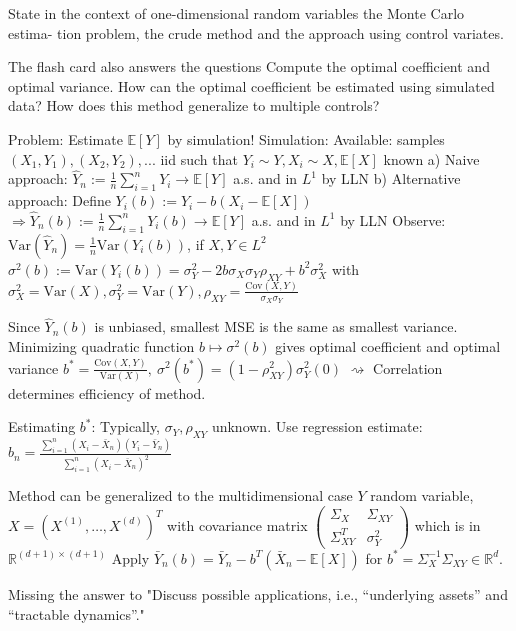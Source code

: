 State in the context of one-dimensional random variables the Monte Carlo estima-
tion problem, the crude method and the approach using control variates.

The flash card also answers the questions
Compute the optimal coefficient and optimal variance.
How can the optimal coefficient be estimated using simulated data?
How does this method generalize to multiple controls?


Problem: Estimate \(\mathbb{E}[Y]\) by simulation!
Simulation: Available: samples \((X_1, Y_1), (X_2, Y_2), ...\) iid such that \(Y_i \sim Y, X_i \sim X, \mathbb{E}[X]\) known
a) Naive approach:
\(\hat{Y}_n := \frac{1}{n} \sum_{i=1}^n Y_i \rightarrow \mathbb{E}[Y]\) a.s. and in \(L^1\) by LLN
b) Alternative approach: Define \(Y_i(b) := Y_i - b(X_i - \mathbb{E}[X])\)
\(\Rightarrow \hat{Y}_n(b) := \frac{1}{n} \sum_{i=1}^n Y_i(b) \rightarrow \mathbb{E}[Y]\) a.s. and in \(L^1\) by LLN
Observe: \(\text{Var}(\hat{Y}_n) = \frac{1}{n} \text{Var}(Y_i(b))\), if \(X, Y \in L^2\)
\( \sigma^2(b) := \text{Var}(Y_i(b)) = \sigma_Y^2 - 2b \sigma_X \sigma_Y \rho_{XY} + b^2 \sigma_X^2\) with \(\sigma_X^2 = \text{Var}(X), \sigma_Y^2 = \text{Var}(Y), \rho_{XY} = \frac{\text{Cov}(X, Y)}{\sigma_X \sigma_Y} \)

Since \(\hat{Y}_n(b)\) is unbiased, smallest MSE is the same as smallest variance.
Minimizing quadratic function \(b \mapsto \sigma^2(b)\) gives optimal coefficient and optimal variance
\(b^{*} = \frac{\text{Cov}(X, Y)}{\text{Var}(X)}, \ \sigma^2(b^{*}) = (1 - \rho_{XY}^2) \sigma_Y^2 (0)\)
\(\rightsquigarrow\) Correlation determines efficiency of method.

Estimating \(b^{*}\): Typically, \(\sigma_Y, \rho_{XY}\) unknown. Use regression estimate:
\( \hat{b}_n = \frac{\sum_{i=1}^n (X_i - \bar{X}_n)(Y_i - \bar{Y}_n)}{\sum_{i=1}^n (X_i - \bar{X}_n)^2} \)

Method can be generalized to the multidimensional case
\(Y\) random variable, \(X = (X^{(1)}, \dots, X^{(d)})^T\) with covariance matrix
\(\begin{pmatrix}
\Sigma_X & \Sigma_{XY} \\
\Sigma_{XY}^T & \sigma_Y^2 
\end{pmatrix}\) 
which is in \(\mathbb{R}^{(d+1) \times (d+1)}\)
Apply \(\bar{Y}_n(b) = \bar{Y}_n - b^T (\bar{X}_n - \mathbb{E}[X])\)
for \(b^{*} = \Sigma_X^{-1} \Sigma_{XY} \in \mathbb{R}^d\).

Missing the answer to "Discuss possible applications, i.e., “underlying assets” and “tractable dynamics”."


